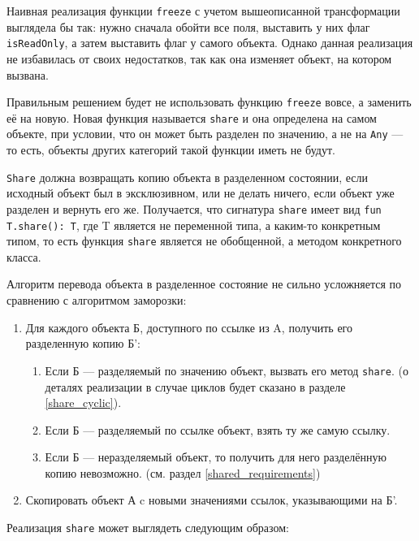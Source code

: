 \documentclass[specification,annotation,times]{itmo-student-thesis}
\begin{document}
Наивная реализация функции \texttt{freeze} с учетом вышеописанной трансформации выглядела бы так: нужно сначала обойти все поля, выставить у них флаг \texttt{isReadOnly}, а затем выставить флаг у самого объекта.
Однако данная реализация не избавилась от своих недостатков, так как она изменяет объект, на котором вызвана.

Правильным решением будет не использовать функцию \texttt{freeze} вовсе, а заменить её на новую. Новая функция называется \texttt{share} и она определена на самом объекте, при условии, что он может быть разделен по значению, а не на \texttt{Any} --- то есть, объекты других категорий такой функции иметь не будут.

\texttt{Share} должна возвращать копию объекта в разделенном состоянии, если исходный объект был в эксклюзивном, или не делать ничего, если объект уже разделен и вернуть его же.
Получается, что сигнатура \texttt{share} имеет вид \texttt{fun T.share(): T}, где T является не переменной типа, а каким-то конкретным типом, то есть функция \texttt{share} является не обобщенной, а методом конкретного класса.

Алгоритм перевода объекта в разделенное состояние не сильно усложняется по сравнению с алгоритмом заморозки:

\begin{enumerate}
	\item Для каждого объекта Б, доступного по ссылке из A, получить его разделенную копию Б':
	\begin{enumerate}
		\item Если Б --- разделяемый по значению объект, вызвать его метод \texttt{share}. (о деталях реализации в случае циклов будет сказано в разделе \ref{share_cyclic}).
		\item Если Б --- разделяемый по ссылке объект, взять ту же самую ссылку.
		\item Если Б --- неразделяемый объект, то получить для него разделённую копию невозможно. (см. раздел \ref{shared_requirements})
	\end{enumerate}
	\item Скопировать объект А c новыми значениями ссылок, указывающими на Б'.
\end{enumerate}

Реализация \texttt{share} может выглядеть следующим образом:
\end{document}

